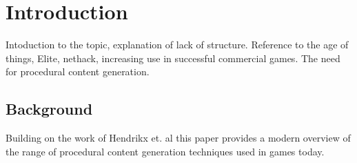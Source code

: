 \documentclass{acm_proc_article-sp}
\begin{document}
\begin{abstract}
\end{abstract}




\section{Introduction}
Intoduction to the topic, explanation of lack of structure. Reference to the age of things, Elite\cite{elite}, nethack, increasing use in successful commercial games. The need for procedural content generation.

\subsection{Background}
Building on the work of Hendrikx et. al \cite{hendrikx2012procedural} this paper provides a modern overview of the range of procedural content generation techniques used in games today.
\end{document}
